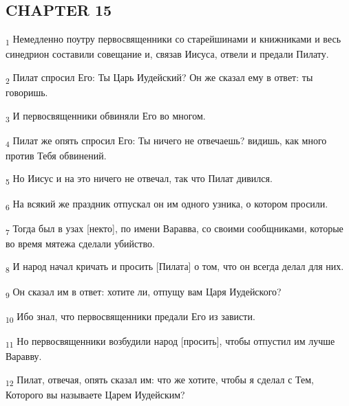 \subsection{CHAPTER 15}
\begin{tcolorbox}
\textsubscript{1} Немедленно поутру первосвященники со старейшинами и книжниками и весь синедрион составили совещание и, связав Иисуса, отвели и предали Пилату.
\end{tcolorbox}
\begin{tcolorbox}
\textsubscript{2} Пилат спросил Его: Ты Царь Иудейский? Он же сказал ему в ответ: ты говоришь.
\end{tcolorbox}
\begin{tcolorbox}
\textsubscript{3} И первосвященники обвиняли Его во многом.
\end{tcolorbox}
\begin{tcolorbox}
\textsubscript{4} Пилат же опять спросил Его: Ты ничего не отвечаешь? видишь, как много против Тебя обвинений.
\end{tcolorbox}
\begin{tcolorbox}
\textsubscript{5} Но Иисус и на это ничего не отвечал, так что Пилат дивился.
\end{tcolorbox}
\begin{tcolorbox}
\textsubscript{6} На всякий же праздник отпускал он им одного узника, о котором просили.
\end{tcolorbox}
\begin{tcolorbox}
\textsubscript{7} Тогда был в узах [некто], по имени Варавва, со своими сообщниками, которые во время мятежа сделали убийство.
\end{tcolorbox}
\begin{tcolorbox}
\textsubscript{8} И народ начал кричать и просить [Пилата] о том, что он всегда делал для них.
\end{tcolorbox}
\begin{tcolorbox}
\textsubscript{9} Он сказал им в ответ: хотите ли, отпущу вам Царя Иудейского?
\end{tcolorbox}
\begin{tcolorbox}
\textsubscript{10} Ибо знал, что первосвященники предали Его из зависти.
\end{tcolorbox}
\begin{tcolorbox}
\textsubscript{11} Но первосвященники возбудили народ [просить], чтобы отпустил им лучше Варавву.
\end{tcolorbox}
\begin{tcolorbox}
\textsubscript{12} Пилат, отвечая, опять сказал им: что же хотите, чтобы я сделал с Тем, Которого вы называете Царем Иудейским?
\end{tcolorbox}
